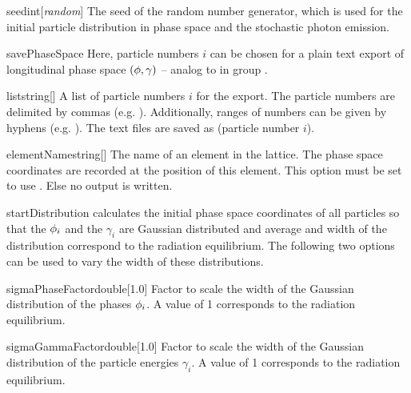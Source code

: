 \documentclass[a4paper]{scrartcl}
\begin{document}
\begin{configdoc}{seed}{int}{}[\textit{random}]
  The seed of the random number generator, which is used for the initial particle
  distribution in phase space and the stochastic photon emission.
\end{configdoc}

\begin{configdocgroup}{savePhaseSpace}
  Here, particle numbers $i$ can be chosen for a plain text export of longitudinal phase
  space $(\phi,\gamma)$ -- analog to  in group
  .

  \begin{configdoc}{list}{string}{}[]
    A list of particle numbers $i$ for the export. The particle numbers are delimited by
    commas (e.g. ). Additionally, ranges of numbers can be given by
    hyphens (e.g. ). The text files are saved as
     (particle number $i$).
  \end{configdoc}

  \begin{configdoc}{elementName}{string}{}[]
    The name of an element in the lattice. The phase space coordinates are recorded at the
    position of this element. This option must be set to use .
    Else no output is written.
  \end{configdoc}
\end{configdocgroup}

\clearpage
\begin{configdocgroup}{startDistribution}
  \polem calculates the initial phase space coordinates of all particles so that the
  $\phi_i$ and the $\gamma_i$ are Gaussian distributed and average and width of the
  distribution correspond to the radiation equilibrium. The following two options can be
  used to vary the width  of these distributions.

  \begin{configdoc}{sigmaPhaseFactor}{double}{}[1.0]
    Factor to scale the width of the Gaussian distribution of the phases $\phi_i$. A value
    of 1 corresponds to the radiation equilibrium.
  \end{configdoc}

  \begin{configdoc}{sigmaGammaFactor}{double}{}[1.0]
    Factor to scale the width of the Gaussian distribution of the particle energies
    $\gamma_i$. A value of 1 corresponds to the radiation equilibrium.
  \end{configdoc}
\end{configdocgroup}
\end{document}
